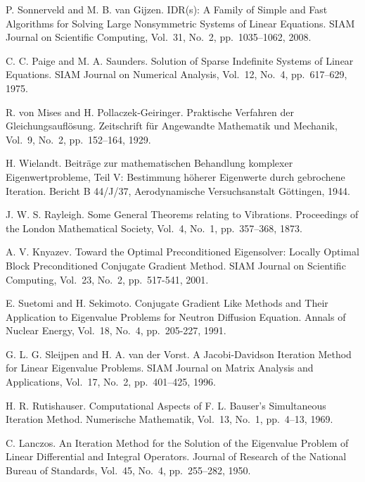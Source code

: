 \documentclass[a4paper]{jarticle}
\begin{document}
{\begin{thebibliography}{10}
P. Sonnerveld and M. B. van Gijzen.
\newblock IDR(s): A Family of Simple and Fast Algorithms for Solving Large Nonsymmetric Systems of Linear Equations.
\newblock SIAM Journal on Scientific Computing, Vol.~31, No.~2, pp.\ 1035--1062, 2008.

C. C. Paige and M. A. Saunders.
\newblock Solution of Sparse Indefinite Systems of Linear Equations.
\newblock SIAM Journal on Numerical Analysis, Vol.~12, No.~4, pp.\ 617--629, 1975.

R. von Mises and H. Pollaczek-Geiringer.
\newblock Praktische Verfahren der Gleichungsaufl\"osung.
\newblock Zeitschrift f\"ur Angewandte Mathematik und Mechanik, Vol.~9, No.~2, pp.\ 152--164, 1929.

H. Wielandt.
\newblock Beitr\"age zur mathematischen Behandlung komplexer
	Eigenwertprobleme, Teil V: Bestimmung h\"oherer Eigenwerte durch
	gebrochene Iteration.
\newblock Bericht B 44/J/37, Aerodynamische Versuchsanstalt G\"ottingen, 1944.

J. W. S. Rayleigh.
\newblock Some General Theorems relating to Vibrations.
\newblock Proceedings of the London Mathematical Society, Vol.~4, No.~1,
	pp.\ 357--368, 1873.

A. V. Knyazev.
\newblock Toward the Optimal Preconditioned Eigensolver: Locally Optimal
	Block Preconditioned Conjugate Gradient Method.
\newblock SIAM Journal on Scientific Computing, Vol.~23, No.~2, pp.\ 517-541, 2001. 

E. Suetomi and H. Sekimoto.
\newblock Conjugate Gradient Like Methods and Their Application to
	Eigenvalue Problems for Neutron Diffusion Equation.
\newblock Annals of Nuclear Energy, Vol.~18, No.~4, pp.\ 205-227, 1991.

G. L. G. Sleijpen and H. A. van der Vorst.
\newblock A Jacobi-Davidson Iteration Method for Linear Eigenvalue Problems.
\newblock SIAM Journal on Matrix Analysis and Applications, Vol.~17, No.~2, pp.\ 401--425, 1996.

H. R. Rutishauser.
\newblock Computational Aspects of F. L. Bauser's Simultaneous Iteration
	Method.
\newblock Numerische Mathematik, Vol.~13, No.~1, pp.\ 4--13, 1969.

C. Lanczos.
\newblock An Iteration Method for the Solution of the Eigenvalue Problem
	of Linear Differential and Integral Operators.
\newblock Journal of Research of the National Bureau of Standards, Vol.~45, No.~4, pp.\ 255--282, 1950.


\end{thebibliography}}
\end{document}
